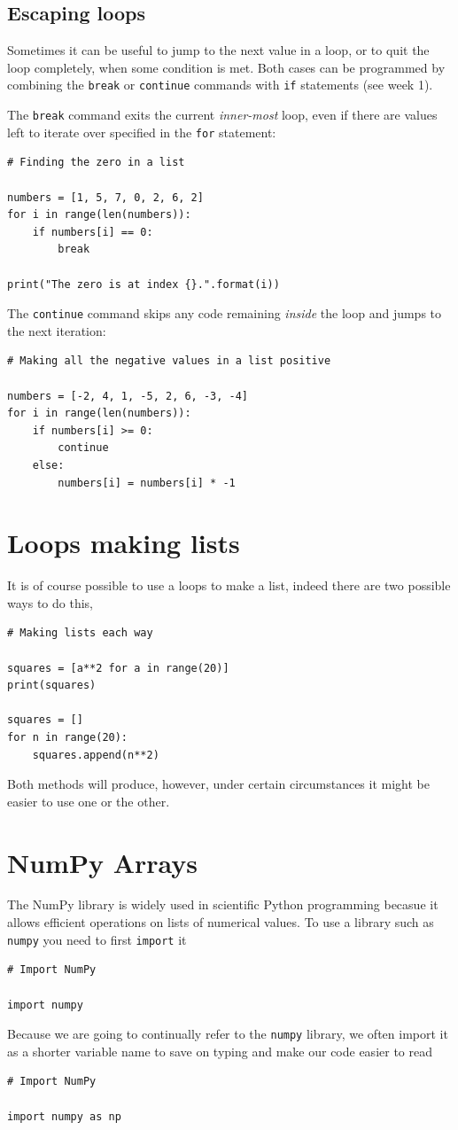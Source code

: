 \documentclass[a4paper]{article}
\begin{document}
\subsection{Escaping loops}
Sometimes it can be useful to jump to the next value in a loop, or to quit the loop completely, when some condition is met. Both cases can be programmed by combining the \texttt{break} or \texttt{continue} commands with \texttt{if} statements (see week 1).

The \texttt{break} command exits the current \emph{inner-most} loop, even if there are values left to iterate over specified in the \texttt{for} statement:
\begin{lstlisting}
# Finding the zero in a list

numbers = [1, 5, 7, 0, 2, 6, 2]
for i in range(len(numbers)):
	if numbers[i] == 0:
		break

print("The zero is at index {}.".format(i))
\end{lstlisting}

The \texttt{continue} command skips any code remaining \emph{inside} the loop and jumps to the next iteration:
\begin{lstlisting}
# Making all the negative values in a list positive

numbers = [-2, 4, 1, -5, 2, 6, -3, -4]
for i in range(len(numbers)):
	if numbers[i] >= 0:
		continue
	else:
		numbers[i] = numbers[i] * -1
\end{lstlisting}

\section{Loops making lists}

It is of course possible to use a loops to make a list, indeed there are two possible ways to do this,
\begin{lstlisting}
# Making lists each way

squares = [a**2 for a in range(20)]
print(squares)

squares = []
for n in range(20):
    squares.append(n**2)
\end{lstlisting}
Both methods will produce, however, under certain circumstances it might be easier to use one or the other.

\section{NumPy Arrays}

The NumPy library is widely used in scientific Python programming becasue it allows efficient operations on lists of numerical values.\cite{numpy}
To use a library such as \texttt{numpy} you need to first \texttt{import} it
\begin{lstlisting}
# Import NumPy

import numpy
\end{lstlisting}
Because we are going to continually refer to the \texttt{numpy} library, we often import it as a shorter variable name to save on typing and make our code easier to read
\begin{lstlisting}
# Import NumPy

import numpy as np
\end{lstlisting}
\end{document}
